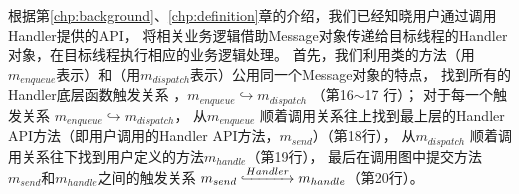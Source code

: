 








根据第\ref{chp:background}、\ref{chp:definition}章的介绍，我们已经知晓用户通过调用Handler提供的API，
将相关业务逻辑借助Message对象传递给目标线程的Handler对象，在目标线程执行相应的业务逻辑处理。
首先，我们利用类的方法（用$m_{enqueue}$表示）和（用$m_{dispatch}$表示）公用同一个Message对象的特点，
找到所有的Handler底层函数触发关系 ，$m_{enqueue}  \hookrightarrow  m_{dispatch}$ （第16$\sim$17 行）；
对于每一个触发关系 $m_{enqueue}  \hookrightarrow  m_{dispatch}$，
从$m_{enqueue}$ 顺着调用关系往上找到最上层的Handler API方法（即用户调用的Handler API方法，$m_{send}$）（第18行），
从$m_{dispatch}$ 顺着调用关系往下找到用户定义的方法$m_{handle}$（第19行），
最后在调用图中提交方法$m_{send}$和$m_{handle}$之间的触发关系 $m_{send} \lhook\joinrel\xrightarrow{Handler} m_{handle}$（第20行）。


